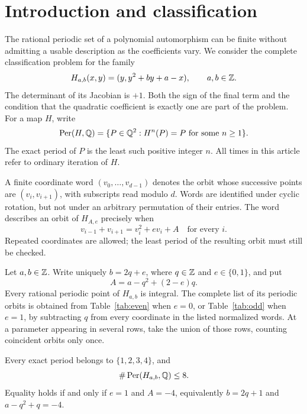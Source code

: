 \section{Introduction and classification}
\label{sec:introduction}

The rational periodic set of a polynomial automorphism can be finite
without admitting a usable description as the coefficients vary. We
consider the complete classification problem for the family
\begin{equation}
 H_{a,b}(x,y)=(y,y^2+by+a-x),\qquad a,b\in\mathbb{Z}.
 \label{eq:family}
\end{equation}
The determinant of its Jacobian is \(+1\). Both the sign of the final
term and the condition that the quadratic coefficient is exactly one
are part of the problem. For a map \(H\), write
\[
 \operatorname{Per}(H,\mathbb{Q})=\{P\in\mathbb{Q}^2:H^n(P)=P\text{ for some }n\ge1\}.
\]
The exact period of \(P\) is the least such positive integer \(n\).
All times in this article refer to ordinary iteration of \(H\).

A finite coordinate word \((v_0,\ldots,v_{d-1})\) denotes the orbit
whose successive points are
\((v_i,v_{i+1})\), with subscripts read modulo \(d\). Words are
identified under cyclic rotation, but not under an arbitrary permutation
of their entries. The word describes an orbit of \(H_{A,e}\) precisely
when
\begin{equation}
 v_{i-1}+v_{i+1}=v_i^2+ev_i+A
 \quad\text{for every }i.
 \label{eq:normalized_word}
\end{equation}
Repeated coordinates are allowed; the least period of the resulting
orbit must still be checked.

\begin{theorem}
\label{thm:classification}
Let \(a,b\in\mathbb{Z}\). Write uniquely \(b=2q+e\), where \(q\in\mathbb{Z}\) and
\(e\in\{0,1\}\), and put
\begin{equation}
 A=a-q^2+(2-e)q.
 \label{eq:normalized_parameter}
\end{equation}
Every rational periodic point of \(H_{a,b}\) is integral. The complete
list of its periodic orbits is obtained from Table~\ref{tab:even} when
\(e=0\), or Table~\ref{tab:odd} when \(e=1\), by subtracting \(q\)
from every coordinate in the listed normalized words. At a parameter
appearing in several rows, take the union of those rows, counting
coincident orbits only once.

Every exact period belongs to \(\{1,2,3,4\}\), and
\begin{equation}
 \#\operatorname{Per}(H_{a,b},\mathbb{Q})\le8.
 \label{eq:eight_bound}
\end{equation}
Equality holds if and only if \(e=1\) and \(A=-4\), equivalently
\(b=2q+1\) and \(a-q^2+q=-4\).
\end{theorem}

